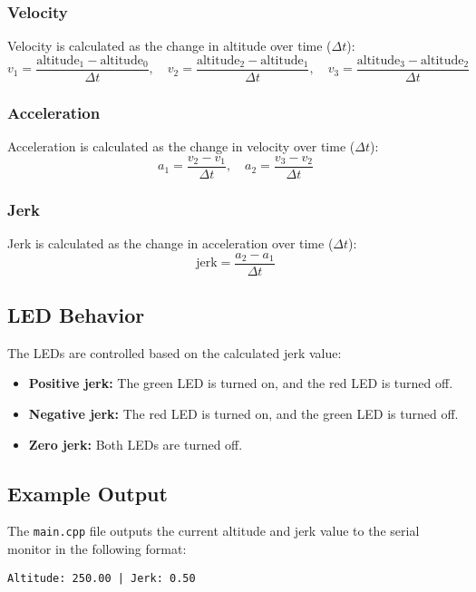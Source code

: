 \documentclass{article}
\begin{document}
\subsubsection{Velocity}
Velocity is calculated as the change in altitude over time (\( \Delta t \)):
\[
v_1 = \frac{\text{altitude}_1 - \text{altitude}_0}{\Delta t}, \quad
v_2 = \frac{\text{altitude}_2 - \text{altitude}_1}{\Delta t}, \quad
v_3 = \frac{\text{altitude}_3 - \text{altitude}_2}{\Delta t}
\]



\subsubsection{Acceleration}
Acceleration is calculated as the change in velocity over time (\( \Delta t \)):
\[
a_1 = \frac{v_2 - v_1}{\Delta t}, \quad
a_2 = \frac{v_3 - v_2}{\Delta t}
\]



\subsubsection{Jerk}
Jerk is calculated as the change in acceleration over time (\( \Delta t \)):
\[
\text{jerk} = \frac{a_2 - a_1}{\Delta t}
\]



\subsection{LED Behavior}
The LEDs are controlled based on the calculated jerk value:
\begin{itemize}
    \item \textbf{Positive jerk:} The green LED is turned on, and the red LED is turned off.
    \item \textbf{Negative jerk:} The red LED is turned on, and the green LED is turned off.
    \item \textbf{Zero jerk:} Both LEDs are turned off.
\end{itemize}



\subsection{Example Output}
The \texttt{main.cpp} file outputs the current altitude and jerk value to the serial monitor in the following format:
\begin{verbatim}
Altitude: 250.00 | Jerk: 0.50
\end{verbatim}
\end{document}
